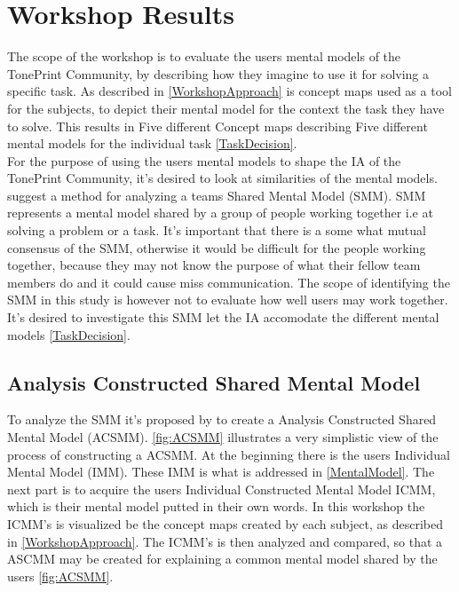 \chapter{Workshop Results}
\label{Chap:WorkshopResults}

The scope of the workshop is to evaluate the users mental models of the TonePrint Community, by describing how they imagine to use it for solving a specific task. As described in \autoref{WorkshopApproach} is concept maps used as a tool for the subjects, to depict their mental model for the context the task they have to solve. This results in Five different Concept maps describing Five different mental models for the individual task \autoref{TaskDecision}. \\
For the purpose of using the users mental models to shape the IA of the TonePrint Community, it's desired to look at similarities of the mental models. \textcite{WEB:ConceptMapAnalysis} suggest a method for analyzing a teams Shared Mental Model (SMM). SMM represents a mental model shared by a group of people working together i.e  at solving a problem or a task. It's important that there is a some what mutual consensus of the SMM, otherwise it would be difficult for the people working together, because they may not know the purpose of what their fellow team members do and it could cause miss communication. The scope of identifying the SMM in this study is however not to evaluate how well users may work together. It's desired to investigate this SMM let the IA accomodate the different mental models \autoref{TaskDecision}.


\section{Analysis Constructed Shared Mental Model}
\label{ACSMM}
To analyze the SMM it's proposed by \textcite{WEB:ConceptMapAnalysis} to create a Analysis Constructed Shared Mental Model (ACSMM). \autoref{fig:ACSMM} illustrates a very simplistic view of the process of constructing a ACSMM. At the beginning there is the users Individual Mental Model (IMM). These IMM is what is addressed in \autoref{MentalModel}. The next part is to acquire the users Individual Constructed Mental Model ICMM, which is their mental model putted in their own words. In this workshop the ICMM's is visualized be the concept maps created by each subject, as described in \autoref{WorkshopApproach}. The ICMM's is then analyzed and compared, so that a ASCMM may be created for explaining a common mental model shared by the users \autoref{fig:ACSMM}.  

